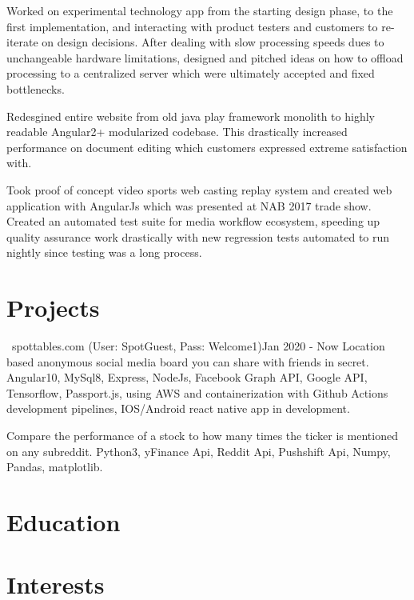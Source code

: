 \documentclass{my_resume}
\begin{document}
\workitemstwo
{Worked on experimental technology app from the starting design phase, to the first implementation, and interacting
with product testers and customers to re-iterate on design decisions.}
{After dealing with slow processing speeds dues to unchangeable hardware limitations, designed and pitched ideas on how to offload
processing to a centralized server which were ultimately accepted and fixed bottlenecks.}

\workitemsone
{Redesgined entire website from old java play framework monolith to highly readable Angular2+ modularized codebase. This drastically increased performance
 on document editing which customers expressed extreme satisfaction with.}

\workitemstwo
{Took proof of concept video sports web casting replay system and created web application with AngularJs
 which was presented at NAB 2017 trade show.}
{Created an automated test suite for media workflow ecosystem, speeding up quality assurance work drastically with new regression tests
 automated to run nightly since testing was a long process.}

\section{Projects}

{\faChrome~spottables.com (User: SpotGuest, Pass: Welcome1)}{Jan 2020 - Now}
\projectitem
{Location based anonymous social media board you can share with friends in secret.}
{Angular10, MySql8, Express, NodeJs, Facebook Graph API, Google API, Tensorflow, Passport.js,
  using AWS and containerization with Github Actions development pipelines, IOS/Android react native app in development.}

\projectitem
{Compare the performance of a stock to how many times the ticker is mentioned on any subreddit.}
{Python3, yFinance Api, Reddit Api, Pushshift Api, Numpy, Pandas, matplotlib.}

\section{Education}

\section{Interests}
\end{document}
